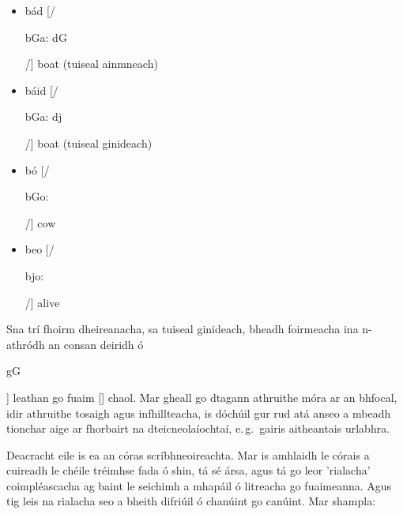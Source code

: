\begin{multicols}{2}
\begin{itemize}
\item bád    [/\begin{IPA}b\super Ga: d\super G\end{IPA}/]  boat  (tuiseal ainmneach)
\item báid   [/\begin{IPA}b\super Ga: d\super j\end{IPA}/]  boat  (tuiseal ginideach)
\end{itemize}

\begin{itemize}
\item bó [/\begin{IPA}b\super Go: \end{IPA}/] cow 
\item beo [/\begin{IPA}b\super jo: \end{IPA}/] alive  
\end{itemize}  

Sna trí fhoirm dheireanacha, sa tuiseal ginideach, bheadh foirmeacha ina n-athródh an consan deiridh ó \begin{IPA}g\super G\end{IPA}] leathan go fuaim [] chaol. Mar gheall go dtagann athruithe móra ar an bhfocal, idir athruithe tosaigh agus infhillteacha, is dóchúil gur rud atá anseo a mbeadh tionchar aige ar fhorbairt na dteicneolaíochtaí, e.\,g.~gairis aitheantais urlabhra. 

Deacracht eile is ea an córas scríbhneoireachta. Mar is amhlaidh le córais a cuireadh le chéile tréimhse fada ó shin, tá sé ársa, agus tá go leor 'rialacha’ coimpléascacha ag baint le seichimh a mhapáil ó litreacha go fuaimeanna. Agus tig leis na rialacha seo a bheith difriúil ó chanúint go canúint. Mar shampla:


\end{multicols}
